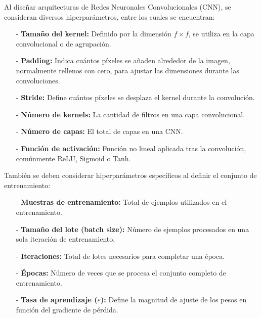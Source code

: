                     Al diseñar arquitecturas de Redes Neuronales Convolucionales (CNN), se consideran diversos hiperparámetros, entre los cuales se encuentran:
                    
                    \begin{itemize}
                        \item[-] \textbf{Tamaño del kernel:} Definido por la dimensión \( f \times f \), se utiliza en la capa convolucional o de agrupación.
                        \item[-] \textbf{Padding:} Indica cuántos píxeles se añaden alrededor de la imagen, normalmente rellenos con cero, para ajustar las dimensiones durante las convoluciones.
                        \item[-] \textbf{Stride:} Define cuántos píxeles se desplaza el kernel durante la convolución.
                        \item[-] \textbf{Número de kernels:} La cantidad de filtros en una capa convolucional.
                        \item[-] \textbf{Número de capas:} El total de capas en una CNN.
                        \item[-] \textbf{Función de activación:} Función no lineal aplicada tras la convolución, comúnmente ReLU, Sigmoid o Tanh.
                    \end{itemize}
                    
                    También se deben considerar hiperparámetros específicos al definir el conjunto de entrenamiento:
                    
                    \begin{itemize}
                        \item[-] \textbf{Muestras de entrenamiento:} Total de ejemplos utilizados en el entrenamiento.
                        \item[-] \textbf{Tamaño del lote (batch size):} Número de ejemplos procesados en una sola iteración de entrenamiento.
                        \item[-] \textbf{Iteraciones:} Total de lotes necesarios para completar una época.
                        \item[-] \textbf{Épocas:} Número de veces que se procesa el conjunto completo de entrenamiento.
                        \item[-] \textbf{Tasa de aprendizaje (\( \varepsilon \)):} Define la magnitud de ajuste de los pesos en función del gradiente de pérdida.
                    \end{itemize}
                    

